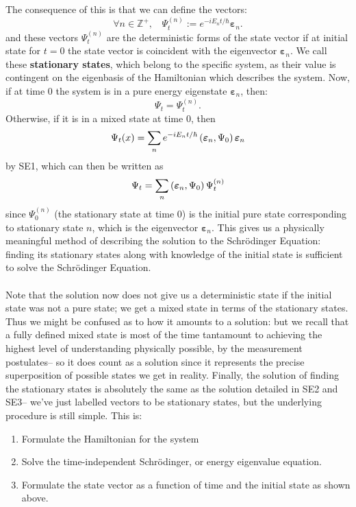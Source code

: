 \begin{enumerate}
    The consequence of this is that we can define the vectors:
    $$
    \forall n\in\mathbb{Z}^+,\:\:\:\:\Psi_{t}^{(n)}:=e^{-iE_{n}t/\hbar}\bm{\varepsilon}_{n}.
    $$
    and these vectors $\Psi_{t}^{(n)}$ are the deterministic forms of the state vector if at initial state for $t=0$ the state vector is coincident with the eigenvector $\bm{\varepsilon}_{n}$. We call these \textbf{stationary states}, which belong to the specific system, as their value is contingent on the eigenbasis of the Hamiltonian which describes the system. Now, if at time 0 the system is in a pure energy eigenstate $\bm{\varepsilon}_{n}$, then:
    $$
    \Psi_{t}=\Psi_{t}^{(n)}.
    $$
    Otherwise, if it is in a mixed state at time 0, then 
    $$
    \Psi_{t}(x)=\sum_{n}e^{-iE_{n}t/\hbar}\left(\bm{\varepsilon}_{n},\Psi_{0}\right)\bm{\varepsilon}_{n}
    $$
    by SE1, which can then be written as
    $$
    \Psi_{t}=\sum_{n}\left(\bm{\varepsilon}_{n},\Psi_{0}\right)\Psi_{t}^{(n)}
    $$
    since $\Psi_{0}^{(n)}$ (the stationary state at time $0$) is the initial pure state corresponding to stationary state $n$, which is the eigenvector $\bm{\varepsilon}_{n}$. This gives us a physically meaningful method of describing the solution to the Schr\"{o}dinger Equation: finding its stationary states along with knowledge of the initial state is sufficient to solve the Schr\"{o}dinger Equation. 
    \\\\
    Note that the solution now does not give us a deterministic state if the initial state was not a pure state; we get a mixed state in terms of the stationary states. Thus we might be confused as to how it amounts to a solution: but we recall that a fully defined mixed state is most of the time tantamount to achieving the highest level of understanding physically possible, by the measurement postulates-- so it does count as a solution since it represents the precise superposition of possible states we get in reality. Finally, the solution of finding the stationary states is absolutely the same as the solution detailed in SE2 and SE3-- we've just labelled vectors to be stationary states, but the underlying procedure is still simple. This is:
    \begin{enumerate}
        \item Formulate the Hamiltonian for the system
        \item Solve the time-independent Schr\"{o}dinger, or energy eigenvalue equation.
        \item Formulate the state vector as a function of time and the initial state as shown above.
    \end{enumerate}
\end{enumerate}
